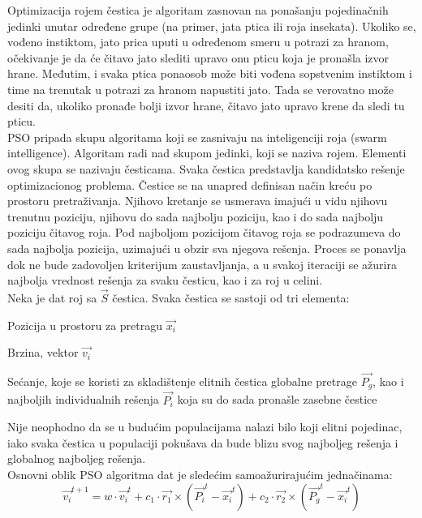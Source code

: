 \documentclass{article}
\begin{document}
Optimizacija rojem čestica je algoritam zasnovan na ponašanju pojedinačnih jedinki unutar određene grupe (na primer, jata ptica ili roja insekata). Ukoliko se, vođeno instiktom, jato prica uputi u određenom smeru u potrazi za hranom, očekivanje je da će čitavo jato slediti upravo onu pticu koja je pronašla izvor hrane. Međutim, i svaka ptica ponaosob može biti vođena sopstvenim instiktom i time na trenutak u potrazi za hranom napustiti jato. Tada se verovatno može desiti da, ukoliko pronađe bolji izvor hrane, čitavo jato upravo krene da sledi tu pticu. \\

PSO pripada skupu algoritama koji se zasnivaju na inteligenciji roja (swarm intelligence). Algoritam radi nad skupom jedinki, koji se naziva rojem. Elementi ovog skupa se nazivaju česticama. 
Svaka čestica predstavlja kandidatsko rešenje optimizacionog problema. Čestice se na unapred definisan način kreću po prostoru pretraživanja. Njihovo kretanje se usmerava imajući u vidu njihovu trenutnu poziciju, njihovu do sada najbolju poziciju, kao i do sada najbolju poziciju čitavog roja. Pod najboljom pozicijom čitavog roja se podrazumeva do sada najbolja pozicija, uzimajući u obzir sva njegova rešenja. Proces se ponavlja dok ne bude zadovoljen kriterijum zaustavljanja, a u svakoj iteraciji se ažurira najbolja vrednost rešenja za svaku česticu, kao i za roj u celini. \\

Neka je dat roj sa $\vec{S}$ čestica. Svaka čestica se sastoji od tri elementa:
\begin{list}{•}{}
	\item Pozicija u prostoru za pretragu $\vec{x_i}$
	\item Brzina, vektor $\vec{v_i}$
	\item Sećanje, koje se koristi za skladištenje elitnih čestica globalne pretrage $\vec{P_g}$, kao i najboljih individualnih rešenja $\vec{P_i}$ koja su do sada pronašle zasebne čestice\\
\end{list}

Nije neophodno da se u budućim populacijama nalazi bilo koji elitni pojedinac, iako svaka čestica u populaciji pokušava da bude blizu svog najboljeg rešenja i globalnog najboljeg rešenja. \\ 


Osnovni oblik PSO algoritma dat je sledećim samoažurirajućim jednačinama: \\ 
\begin{equation}\label{eq:v}
\vec{v_{i}}^{t+1} = w \cdot \vec{v_{i}}^{t} + c_1 \cdot \vec{r_1} \times (\vec{P_{i}}^{t} - \vec{x_{i}}^{t}) + c_2\cdot \vec{r_2} \times (\vec{P_{g}}^{t} - \vec{x_{i}}^{t}) 
\end{equation}
\end{document}
